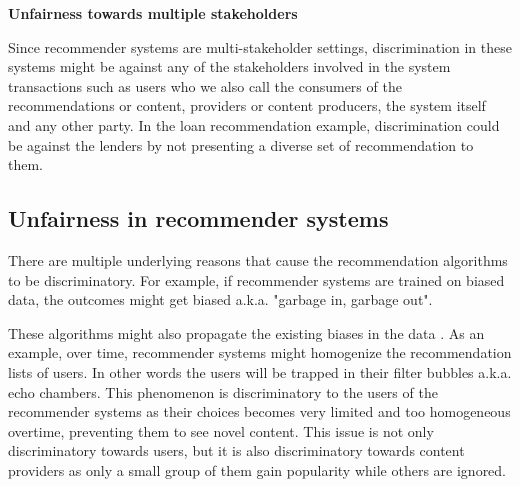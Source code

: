 

\textbf{Unfairness towards multiple stakeholders}

Since recommender systems are multi-stakeholder settings, discrimination in these systems might be against any of the stakeholders involved in the system transactions such as users who we also call the consumers of the recommendations or content, providers or content producers, the system itself and any other party. In the loan recommendation example, discrimination could be against the lenders by not presenting a diverse set of recommendation to them.


\subsection{Unfairness in recommender systems}

There are multiple underlying reasons that cause the recommendation algorithms to be discriminatory. For example, if recommender systems are trained on biased data, the outcomes might get biased a.k.a. "garbage in, garbage out". 

These algorithms might also propagate the existing biases in the data \cite{barocas2016big}. As an example, over time, recommender systems might homogenize the recommendation lists of users. In other words the users will be trapped in their filter bubbles a.k.a. echo chambers. This phenomenon is discriminatory to the users of the recommender systems as their choices becomes very limited and too homogeneous overtime, preventing them to see novel content. This issue is not only discriminatory towards users, but it is also discriminatory towards content providers as only a small group of them gain popularity while others are ignored.

